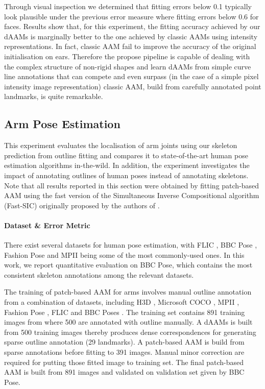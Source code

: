 Through visual inspection we determined that fitting errors below 0.1 typically look plausible under the previous error measure where fitting errors below 0.6 for faces. Results show that, for this experiment, the fitting accuracy achieved by our dAAMs is marginally better to the one achieved by classic AAMs using intensity representations. In fact, classic AAM fail to improve the accuracy of the original initialisation on ears. Therefore the propose pipeline is capable of dealing with the complex structure of non-rigid shapes and learn dAAMs from simple curve line annotations that can compete and even surpass (in the case of a simple pixel intensity image representation) classic AAM, build from carefully annotated point landmarks, is quite remarkable.



\subsection{Arm Pose Estimation}
\label{exp:benchmark}

This experiment evaluates the localisation of arm joints using our skeleton prediction from outline fitting and compares it to state-of-the-art human pose estimation algorithms in-the-wild. 
In addition, the experiment investigates the impact of annotating outlines of human poses instead of annotating skeletons. Note that all results reported in this section were obtained by fitting patch-based AAM using the fast version of the Simultaneous Inverse Compositional algorithm (Fast-SIC) originally proposed by the authors of \cite{Papandreou2008}. 




\paragraph{Dataset \& Error Metric} There exist several datasets for human pose estimation, with FLIC \cite{sapp2013modec}, BBC Pose \cite{pfister2015flowing}, Fashion Pose \cite{dantone2013human} and MPII \cite{andriluka14cvpr} being some of the most commonly-used ones. In this work, we report quantitative evaluation on BBC Pose, which contains the most consistent skeleton annotations among the relevant datasets.

The training of patch-based AAM for arms involves manual outline annotation from a combination of datasets, including H3D \cite{PoseletsICCV09}, Microsoft COCO \cite{lin2014microsoft}, MPII \cite{andriluka14cvpr}, Fashion Pose \cite{dantone2013human}, FLIC \cite{sapp2013modec} and BBC Poses \cite{pfister2015flowing}. The training set contains 891 training images from where 500 are annotated with outline manually. A dAAMs is built from 500 training images thereby produces dense correspondences for generating sparse outline annotation (29 landmarks). A patch-based AAM is build from sparse annotations before fitting to 391 images. Manual minor correction are required for putting those fitted image to training set. The final patch-based AAM is built from 891 images and validated on validation set given by BBC Pose.

